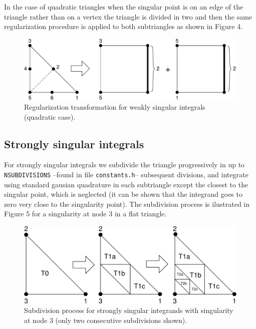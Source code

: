 \documentclass[12pt]{article}
\begin{document}
In the case of quadratic triangles when the singular point is on an edge of the triangle rather than on a vertex the triangle is divided in two and then the same regularization procedure is applied to both subtriangles as shown in Figure 4.

\begin{figure}[!hbt]
\begin{center}
\includegraphics[width=\textwidth]{weakly_singular_t6.pdf}
\caption{Regularization transformation for weakly singular integrals (quadratic case).}
\end{center}
\end{figure}

\subsection*{Strongly singular integrals}
For strongly singular integrals we subdivide the triangle progressively in up to \verb+NSUBDIVISIONS+ --found in file \verb+constants.h+-- subsequent divisions, and integrate using standard gausian quadrature in each subtriangle except the closest to the singular point, which is neglected (it can be shown that the integrand goes to zero very close to the singularity point). The subdivision process is ilustrated in Figure 5 for a singularity at node 3 in a flat triangle.

\begin{figure}[!hbt]
\begin{center}
\includegraphics[width=\textwidth]{strongly_singular.pdf}
\caption{Subdivision process for strongly singular integrands with singularity at node 3 (only two consecutive subdivisions shown).}
\end{center}
\end{figure}
\end{document}
